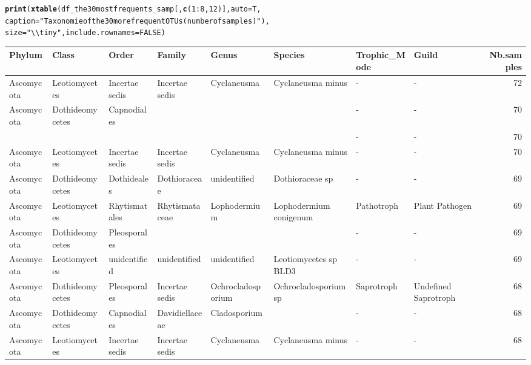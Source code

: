 \documentclass[12pt]{article}\usepackage[]{graphicx}\usepackage[]{color}
\makeatletter
\newcommand{\hlnum}[1]{\textcolor[rgb]{0.686,0.059,0.569}{#1}}%
\newcommand{\hlstr}[1]{\textcolor[rgb]{0.192,0.494,0.8}{#1}}%
\newcommand{\hlopt}[1]{\textcolor[rgb]{0,0,0}{#1}}%
\newcommand{\hlstd}[1]{\textcolor[rgb]{0.345,0.345,0.345}{#1}}%
\newcommand{\hlkwc}[1]{\textcolor[rgb]{0.333,0.667,0.333}{#1}}%
\newcommand{\hlkwd}[1]{\textcolor[rgb]{0.737,0.353,0.396}{\textbf{#1}}}%
\newenvironment{kframe}{%
 \def\at@end@of@kframe{}%
 \ifinner\ifhmode%
  \def\at@end@of@kframe{\end{minipage}}%
  \begin{minipage}{\columnwidth}%
 \fi\fi%
 \def\FrameCommand##1{\hskip\@totalleftmargin \hskip-\fboxsep
 \colorbox{shadecolor}{##1}\hskip-\fboxsep
     \hskip-\linewidth \hskip-\@totalleftmargin \hskip\columnwidth}%
 \MakeFramed {\advance\hsize-\width
   \@totalleftmargin\z@ \linewidth\hsize
   \@setminipage}}%
 {\par\unskip\endMakeFramed%
 \at@end@of@kframe}
\numberwithin{figure}{section}
\makeatother
\begin{document}
\begin{landscape}
\begin{kframe}
\begin{alltt}
\hlkwd{print}\hlstd{(}\hlkwd{xtable}\hlstd{(df_the30mostfrequents_samp[,} \hlkwd{c}\hlstd{(}\hlnum{1}\hlopt{:}\hlnum{8}\hlstd{,} \hlnum{12}\hlstd{)],} \hlkwc{auto} \hlstd{= T,}
      \hlkwc{caption} \hlstd{=} \hlstr{"Taxonomie of the 30 more frequent OTUs (number of samples)"}\hlstd{),}
      \hlkwc{size} \hlstd{=} \hlstr{"\textbackslash{}\textbackslash{}tiny"}\hlstd{,} \hlkwc{include.rownames} \hlstd{=} \hlnum{FALSE}\hlstd{)}
\end{alltt}
\end{kframe}%
\begin{table}[ht]
\centering
\begingroup\tiny
\begin{tabular}{llllllllr}
  \hline
Phylum & Class & Order & Family & Genus & Species & Trophic\_Mode & Guild & Nb.samples \\ 
  \hline
Ascomycota & Leotiomycetes & Incertae sedis & Incertae sedis & Cyclaneusma & Cyclaneusma minus & - & - & 72 \\ 
  Ascomycota & Dothideomycetes & Capnodiales &  &  &  & - & - & 70 \\ 
   &  &  &  &  &  & - & - & 70 \\ 
  Ascomycota & Leotiomycetes & Incertae sedis & Incertae sedis & Cyclaneusma & Cyclaneusma minus & - & - & 70 \\ 
  Ascomycota & Dothideomycetes & Dothideales & Dothioraceae & unidentified & Dothioraceae sp & - & - & 69 \\ 
  Ascomycota & Leotiomycetes & Rhytismatales & Rhytismataceae & Lophodermium & Lophodermium conigenum & Pathotroph & Plant Pathogen & 69 \\ 
  Ascomycota & Dothideomycetes & Pleosporales &  &  &  & - & - & 69 \\ 
  Ascomycota & Leotiomycetes & unidentified & unidentified & unidentified & Leotiomycetes sp BLD3 & - & - & 69 \\ 
  Ascomycota & Dothideomycetes & Pleosporales & Incertae sedis & Ochrocladosporium & Ochrocladosporium sp & Saprotroph & Undefined Saprotroph & 68 \\ 
  Ascomycota & Dothideomycetes & Capnodiales & Davidiellaceae & Cladosporium &  & - & - & 68 \\ 
  Ascomycota & Leotiomycetes & Incertae sedis & Incertae sedis & Cyclaneusma & Cyclaneusma minus & - & - & 68 \\ 

\end{tabular}
\end{table}
\end{landscape}
\end{document}
